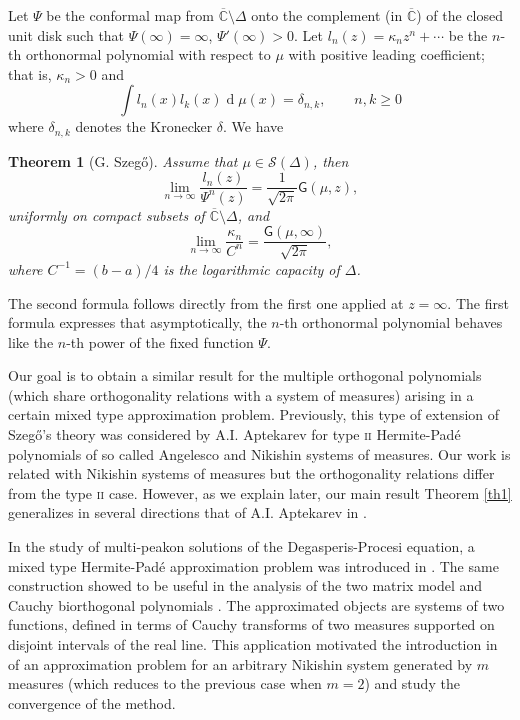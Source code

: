 \documentclass{amsart}
\numberwithin{equation}{section}
\newtheorem{theorem}{Theorem}[section]
\theoremstyle{definition}
\DeclareMathOperator{\D}{d}        %
\newcommand{\CC}{\mathbb{C}}      %
\begin{document}
    Let $\Psi$ be the conformal map from $\overline{\CC} \setminus \Delta$ onto the complement (in $\overline{\CC}$) of the closed unit disk such that $\Psi(\infty) = \infty$, $\Psi'(\infty) > 0$.
 Let $l_n(z) = \kappa_n z^n + \cdots $ be the $n$-th orthonormal polynomial with respect to $\mu$ with positive leading coefficient; that is, $\kappa_n > 0$ and
    \[ \int l_n(x) l_k(x) \D \mu(x)= \delta_{n,k},  \qquad n,k \geq 0
    \]
    where $\delta_{n,k}$ denotes the Kronecker $\delta$. We have

    \begin{theorem}[G. Szeg\H{o}]
        \label{Szego}
        Assume that $\mu \in \mathcal{S}(\Delta)$, then
        \[ \lim_{n\to \infty} \frac{l_n(z)}{\Psi^n(z)} = \frac{1}{\sqrt{2\pi}} \mathsf{G}(\mu,z),
        \]
        uniformly on compact subsets of $\overline{\CC} \setminus \Delta$, and
        \[ \lim_{n \to \infty} \frac{\kappa_n}{C^n} = \frac{\mathsf{G}(\mu,\infty)}{\sqrt{2\pi}},
        \]
        where $C^{-1} = (b-a)/4$ is the logarithmic capacity of $\Delta$.
    \end{theorem}

    The second formula follows directly from the first one applied at $z = \infty$. The first formula expresses that asymptotically, the $n$-th orthonormal polynomial behaves like the $n$-th power of the fixed function $\Psi$.

    Our goal is to obtain a similar result for the multiple orthogonal polynomials (which share orthogonality relations with a system of measures)  arising in  a certain mixed type approximation problem. Previously, this type of extension of Szeg\H{o}'s theory was considered by A.I. Aptekarev \cite{sasha89, sasha99} for type \textsc{ii} Hermite-Pad\'e polynomials of so called Angelesco and Nikishin systems of measures. Our work is related with Nikishin systems of measures but the orthogonality relations differ from the type \textsc{ii} case. However, as we explain later, our main result Theorem \ref{th1}
    generalizes in several directions that of A.I. Aptekarev in \cite[Theorem 2]{sasha99}.

    In the study of multi-peakon solutions of the Degasperis-Procesi equation, a mixed type Hermite-Pad\'e approximation problem was introduced  in \cite{JacLun05}. The same construction showed to be useful in the analysis of  the two matrix model \cite{BGS13} and Cauchy biorthogonal polynomials \cite{Bertola:CBOPs}. The approximated objects are systems of two functions, defined in terms of Cauchy transforms of two measures supported on disjoint intervals of the real line. This application  motivated the introduction in \cite{LSJ19} of an approximation problem for an arbitrary Nikishin system generated by $m$ measures (which reduces to the previous case when $m=2$) and study the convergence of the method.
\end{document}

